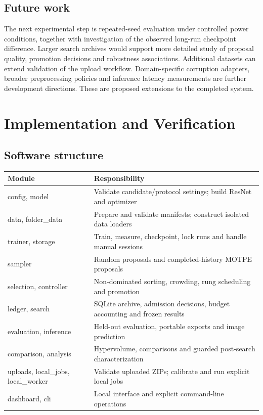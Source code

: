 \documentclass[11pt,a4paper,oneside]{report}
\begin{document}
\section{Future work}
The next experimental step is repeated-seed evaluation under controlled power conditions, together with investigation of the observed long-run checkpoint difference. Larger search archives would support more detailed study of proposal quality, promotion decisions and robustness associations. Additional datasets can extend validation of the upload workflow. Domain-specific corruption adapters, broader preprocessing policies and inference latency measurements are further development directions. These are proposed extensions to the completed system.
\appendix
{}
\chapter{Implementation and Verification}
\section{Software structure}

\begin{table}[H]
\centering\small
\renewcommand{\arraystretch}{1.18}
\begin{tabularx}{\textwidth}{>{\raggedright\arraybackslash}p{}>{\raggedright\arraybackslash}X}
\toprule
\textbf{Module} & \textbf{Responsibility} \\
\midrule
config, model & Validate candidate/protocol settings; build ResNet and optimizer \\
data, folder\_data & Prepare and validate manifests; construct isolated data loaders \\
trainer, storage & Train, measure, checkpoint, lock runs and handle manual sessions \\
sampler & Random proposals and completed-history MOTPE proposals \\
selection, controller & Non-dominated sorting, crowding, rung scheduling and promotion \\
ledger, search & SQLite archive, admission decisions, budget accounting and frozen results \\
evaluation, inference & Held-out evaluation, portable exports and image prediction \\
comparison, analysis & Hypervolume, comparisons and guarded post-search characterization \\
uploads, local\_jobs, local\_worker & Validate uploaded ZIPs; calibrate and run explicit local jobs \\
dashboard, cli & Local interface and explicit command-line operations \\
\bottomrule
\end{tabularx}
\end{table}
\end{document}
